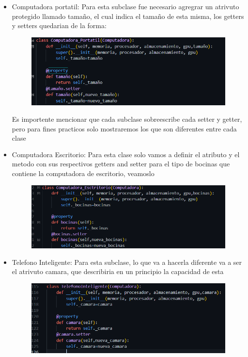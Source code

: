 \documentclass[12pt]{article}
\begin{document}
\begin{itemize}

\item Computadora portatil: Para esta subclase fue necesario agregrar un atrivuto protegido llamado tamaño, el cual indica el tamaño de esta misma, los getters y setters quedarian de la forma:
\begin{figure}[H]
		\begin{center}
 			\includegraphics[width = .6\textwidth]{03.png}
 			 	
		\end{center} 
\end{figure}
Es importente mencionar que cada subclase sobreescribe cada setter y getter, pero para fines practicos solo mostraremos los que son diferentes entre cada clase

\item Computadora Escritorio: Para esta clase solo vamos a definir el atributo y el metodo con sus respectivos getters and setter para el tipo de bocinas que contiene la computadora de escritorio, veamoslo 
\begin{figure}[H]
		\begin{center}
 			\includegraphics[width = .6\textwidth]{04.png}
 			 	
		\end{center} 
\end{figure}

\item Telefono Inteligente: Para esta subclase, lo que va a hacerla diferente va a ser el atrivuto camara, que describiria en un principio la capacidad de esta
\begin{figure}[H]
		\begin{center}
 			\includegraphics[width = .6\textwidth]{05.png}
 			 	

\end{center}
\end{figure}
\end{itemize}
\end{document}

